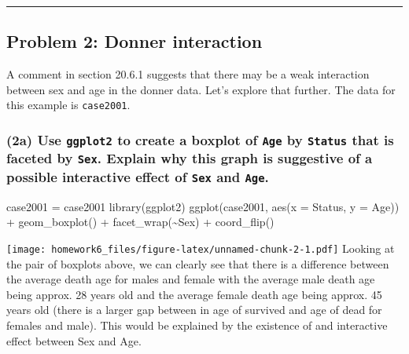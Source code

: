 \documentclass[
]{article}
\newenvironment{Shaded}{\begin{snugshade}}{\end{snugshade}}
\newcommand{\AttributeTok}[1]{\textcolor[rgb]{0.77,0.63,0.00}{#1}}
\newcommand{\FunctionTok}[1]{\textcolor[rgb]{0.00,0.00,0.00}{#1}}
\newcommand{\NormalTok}[1]{#1}
\newcommand{\OtherTok}[1]{\textcolor[rgb]{0.56,0.35,0.01}{#1}}
\newcommand{\SpecialCharTok}[1]{\textcolor[rgb]{0.00,0.00,0.00}{#1}}
\begin{document}
\begin{center}\rule{0.5\linewidth}{0.5pt}\end{center}

\hypertarget{problem-2-donner-interaction}{%
\subsection{Problem 2: Donner
interaction}\label{problem-2-donner-interaction}}

A comment in section 20.6.1 suggests that there may be a weak
interaction between sex and age in the donner data. Let's explore that
further. The data for this example is \texttt{case2001}.

\hypertarget{a-use-ggplot2-to-create-a-boxplot-of-age-by-status-that-is-faceted-by-sex.-explain-why-this-graph-is-suggestive-of-a-possible-interactive-effect-of-sex-and-age.}{%
\subsubsection{\texorpdfstring{(2a) Use \texttt{ggplot2} to create a
boxplot of \texttt{Age} by \texttt{Status} that is faceted by
\texttt{Sex}. Explain why this graph is suggestive of a possible
interactive effect of \texttt{Sex} and
\texttt{Age}.}{(2a) Use ggplot2 to create a boxplot of Age by Status that is faceted by Sex. Explain why this graph is suggestive of a possible interactive effect of Sex and Age.}}\label{a-use-ggplot2-to-create-a-boxplot-of-age-by-status-that-is-faceted-by-sex.-explain-why-this-graph-is-suggestive-of-a-possible-interactive-effect-of-sex-and-age.}}

\begin{Shaded}
\begin{Highlighting}[]
\NormalTok{case2001 }\OtherTok{=}\NormalTok{ case2001}
\FunctionTok{library}\NormalTok{(ggplot2)}
\FunctionTok{ggplot}\NormalTok{(case2001, }\FunctionTok{aes}\NormalTok{(}\AttributeTok{x =}\NormalTok{ Status, }\AttributeTok{y =}\NormalTok{ Age)) }\SpecialCharTok{+}
 \FunctionTok{geom\_boxplot}\NormalTok{() }\SpecialCharTok{+}
\FunctionTok{facet\_wrap}\NormalTok{(}\SpecialCharTok{\textasciitilde{}}\NormalTok{Sex) }\SpecialCharTok{+} 
 \FunctionTok{coord\_flip}\NormalTok{()}
\end{Highlighting}
\end{Shaded}

\texttt{[image: homework6\_files/figure-latex/unnamed-chunk-2-1.pdf]}
Looking at the pair of boxplots above, we can clearly see that there is
a difference between the average death age for males and female with the
average male death age being approx. 28 years old and the average female
death age being approx. 45 years old (there is a larger gap between in
age of survived and age of dead for females and male). This would be
explained by the existence of and interactive effect between Sex and
Age.
\end{document}
